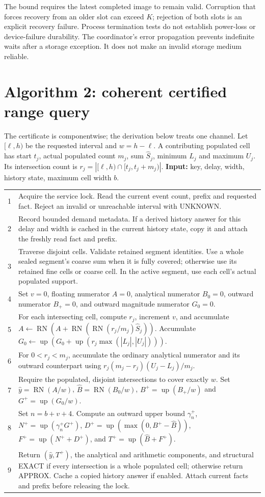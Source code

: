 \documentclass[10pt]{article}
\newcommand{\up}{\operatorname{up}}
\newcommand{\RN}{\operatorname{RN}}
\begin{document}
The bound requires the latest completed image to remain valid. Corruption that forces recovery from an older slot can exceed $K$; rejection of both slots is an explicit recovery failure. Process termination tests do not establish power-loss or device-failure durability. The coordinator's error propagation prevents indefinite waits after a storage exception. It does not make an invalid storage medium reliable.

\section{Algorithm 2: coherent certified range query}
The certificate is componentwise; the derivation below treats one channel. Let $[\ell,h)$ be the requested interval and $w=h-\ell$. A contributing populated cell has start $t_j$, actual populated count $m_j$, sum $\widehat S_j$, minimum $L_j$ and maximum $U_j$. Its intersection count is $r_j=|[\ell,h)\cap[t_j,t_j+m_j)|$.
\smallskip
\noindent\textbf{Input:} key, delay, width, history state, maximum cell width $b$.\par
\smallskip
\noindent\begin{tabular}{@{}r p{.90\linewidth}@{}}
1 & Acquire the service lock. Read the current event count, prefix and requested fact. Reject an invalid or unreachable interval with UNKNOWN.\\
2 & Record bounded demand metadata. If a derived history answer for this delay and width is cached in the current history state, copy it and attach the freshly read fact and prefix.\\
3 & Traverse disjoint cells. Validate retained segment identities. Use a whole sealed segment's coarse sum when it is fully covered; otherwise use its retained fine cells or coarse cell. In the active segment, use each cell's actual populated support.\\
4 & Set $v=0$, floating numerator $A=0$, analytical numerator $B_0=0$, outward numerator $B_+=0$, and outward magnitude numerator $G_0=0$.\\
5 & For each intersecting cell, compute $r_j$, increment $v$, and accumulate $A\leftarrow\RN(A+\RN(\RN(r_j/m_j)\widehat S_j))$. Accumulate $G_0\leftarrow\up(G_0+\up(r_j\max(|L_j|,|U_j|)))$.\\
6 & For $0<r_j<m_j$, accumulate the ordinary analytical numerator and its outward counterpart using $r_j(m_j-r_j)(U_j-L_j)/m_j$.\\
7 & Require the populated, disjoint intersections to cover exactly $w$. Set $\widehat y=\RN(A/w)$, $\widehat B=\RN(B_0/w)$, $B^+=\up(B_+/w)$ and $G^+=\up(G_0/w)$.\\
8 & Set $n=b+v+4$. Compute an outward upper bound $\gamma_n^+$, $N^+=\up(\gamma_n^+G^+)$, $D^+=\up(\max(0,B^+-\widehat B))$, $F^+=\up(N^++D^+)$, and $T^+=\up(\widehat B+F^+)$.\\
9 & Return $(\widehat y,T^+)$, the analytical and arithmetic components, and structural EXACT if every intersection is a whole populated cell; otherwise return APPROX. Cache a copied history answer if enabled. Attach current facts and prefix before releasing the lock.\\
\end{tabular}
\smallskip
\end{document}
